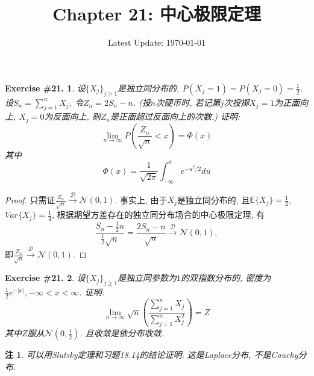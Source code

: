 \documentclass[UTF8, a4paper]{article}
\title{Chapter 21: 中心极限定理}
\author{}
\date{Latest Update: \today}
\newtheorem{exercise}{Exercise \#21.}
\newtheorem*{remark}{注}
\begin{document}
\maketitle

\begin{framed}
\begin{exercise}
设\(\{X_j\}_{j\geq 1}\)是独立同分布的, \(P(X_j = 1) = P(X_j =  0) = \frac{1}{2}\).
设\(S_n = \sum_{j=1}^{n}X_j\), 令\(Z_n = 2S_n - n\). (投\(n\)次硬币时, 若记第\(j\)次投掷\(X_j = 1\)为正面向上, \(X_j = 0\)为反面向上, 则\(Z_n\)是正面超过反面向上的次数.)
证明: 
$$
\lim _{n \rightarrow \infty} P\left(\frac{Z_n}{\sqrt{n}}<x\right)=\Phi(x)
$$
其中 
$$
\Phi(x)=\frac{1}{\sqrt{2 \pi}} \int_{-\infty}^x e^{-u^2 / 2} d u
$$
\end{exercise}
\end{framed}

\begin{proof}
只需证\(\frac{Z_n}{\sqrt{n}} \xrightarrow{\mathcal{D}} \mathcal{N}(0, 1)\).
事实上, 由于\(X_j\)是独立同分布的, 且\(\mathbb{E}\{X_j\} = \frac{1}{2}\), \(Var\{X_j\} = \frac{1}{4}\), 根据期望方差存在的独立同分布场合的中心极限定理, 有
$$
\frac{S_n - \frac{1}{2}n}{\frac{1}{2}\sqrt{n}} = \frac{2S_n - n}{\sqrt{n}} \xrightarrow{\mathcal{D}} \mathcal{N}(0, 1), 
$$
即\(\frac{Z_n}{\sqrt{n}} \xrightarrow{\mathcal{D}} \mathcal{N}(0, 1)\).
\end{proof}


\begin{framed}
\begin{exercise}
设\(\{X_j\}_{j\geq 1}\)是独立同参数为\(1\)的双指数分布的, 密度为\(\frac{1}{2}e^{-|x|}, -\infty < x < \infty\).
证明: 
$$
\lim _{n \rightarrow \infty} \sqrt{n}\left(\frac{\sum_{j=1}^n X_j}{\sum_{j=1}^n X_j^2}\right)=Z
$$
其中\(Z\)服从\(\mathcal{N}\left(0, \frac{1}{2}\right)\).
且收敛是依分布收敛.
\end{exercise}
\end{framed}

\begin{remark}
可以用Slutsky定理和习题18.14的结论证明. 这是Laplace分布, 不是Cauchy分布.
\end{remark}
\end{document}
